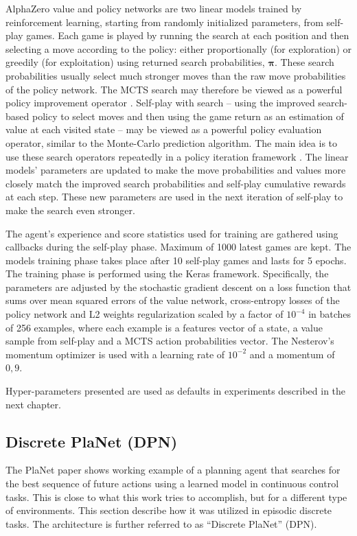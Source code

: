 AlphaZero value and policy networks are two linear models trained by reinforcement learning, starting from randomly initialized parameters, from self-play games. Each game is played by running the search at each position and then selecting a move according to the policy: either proportionally (for exploration) or greedily (for exploitation) using returned search probabilities, $\boldsymbol\pi$. These search probabilities usually select much stronger moves than the raw move probabilities of the policy network. The MCTS search may therefore be viewed as a powerful policy improvement operator \cite{Book.RLAI}. Self-play with search – using the improved search-based policy to select moves and then using the game return as an estimation of value at each visited state – may be viewed as a powerful policy evaluation operator, similar to the Monte-Carlo prediction algorithm. The main idea is to use these search operators repeatedly in a policy iteration framework \cite{Algo.AlphaGoZero}. The linear models' parameters are updated to make the move probabilities and values more closely match the improved search probabilities and self-play cumulative rewards at each step. These new parameters are used in the next iteration of self-play to make the search even stronger.

The agent's experience and score statistics used for training are gathered using callbacks during the self-play phase. Maximum of 1000 latest games are kept. The models training phase takes place after 10 self-play games and lasts for 5 epochs. The training phase is performed using the Keras \cite{Code.Keras} framework. Specifically, the parameters are adjusted by the stochastic gradient descent on a loss function that sums over mean squared errors of the value network, cross-entropy losses of the policy network and L2 weights regularization scaled by a factor of $10^{-4}$ in batches of 256 examples, where each example is a features vector of a state, a value sample from self-play and a MCTS action probabilities vector. The Nesterov's momentum optimizer \cite{Algo.Nesterov} is used with a learning rate of $10^{-2}$ and a momentum of $0,9$.

Hyper-parameters presented are used as defaults in experiments described in the next chapter.

\subsection{Discrete PlaNet (DPN)}

The PlaNet paper \cite{Algo.PlaNet} shows working example of a planning agent that searches for the best sequence of future actions using a learned model in continuous control tasks. This is close to what this work tries to accomplish, but for a different type of environments. This section describe how it was utilized in episodic discrete tasks. The architecture is further referred to as ``Discrete PlaNet'' (DPN).

